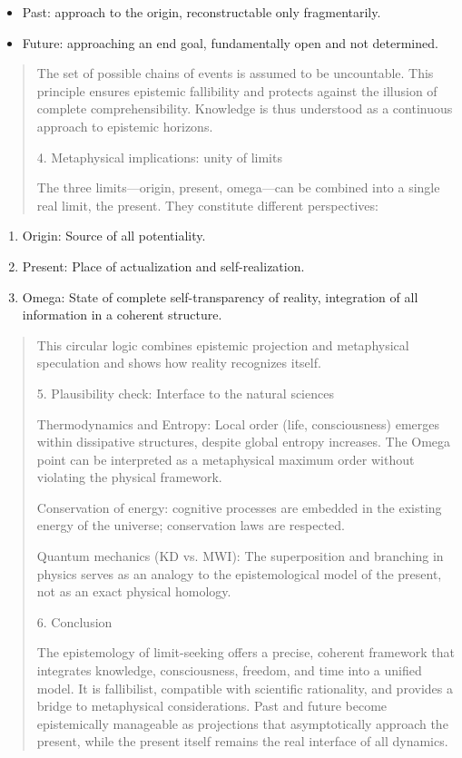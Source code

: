 \documentclass[
  ngerman,
]{article}
\begin{document}
\begin{itemize}
\item
  Past: approach to the origin, reconstructable only fragmentarily.
\item
  Future: approaching an end goal, fundamentally open and not
  determined.
\end{itemize}

\begin{quote}
The set of possible chains of events is assumed to be uncountable. This
principle ensures epistemic fallibility and protects against the
illusion of complete comprehensibility. Knowledge is thus understood as
a continuous approach to epistemic horizons.

4. Metaphysical implications: unity of limits

The three limits---origin, present, omega---can be combined into a
single real limit, the present. They constitute different perspectives:
\end{quote}

\begin{enumerate}
\def\labelenumi{\arabic{enumi}.}
\item
  Origin: Source of all potentiality.
\item
  Present: Place of actualization and self-realization.
\item
  Omega: State of complete self-transparency of reality, integration of
  all information in a coherent structure.
\end{enumerate}

\begin{quote}
This circular logic combines epistemic projection and metaphysical
speculation and shows how reality recognizes itself.

5. Plausibility check: Interface to the natural sciences

Thermodynamics and Entropy: Local order (life, consciousness) emerges
within dissipative structures, despite global entropy increases. The
Omega point can be interpreted as a metaphysical maximum order without
violating the physical framework.

Conservation of energy: cognitive processes are embedded in the existing
energy of the universe; conservation laws are respected.

Quantum mechanics (KD vs. MWI): The superposition and branching in
physics serves as an analogy to the epistemological model of the
present, not as an exact physical homology.

6. Conclusion

The epistemology of limit-seeking offers a precise, coherent framework
that integrates knowledge, consciousness, freedom, and time into a
unified model. It is fallibilist, compatible with scientific
rationality, and provides a bridge to metaphysical considerations. Past
and future become epistemically manageable as projections that
asymptotically approach the present, while the present itself remains
the real interface of all dynamics.
\end{quote}
\end{document}
